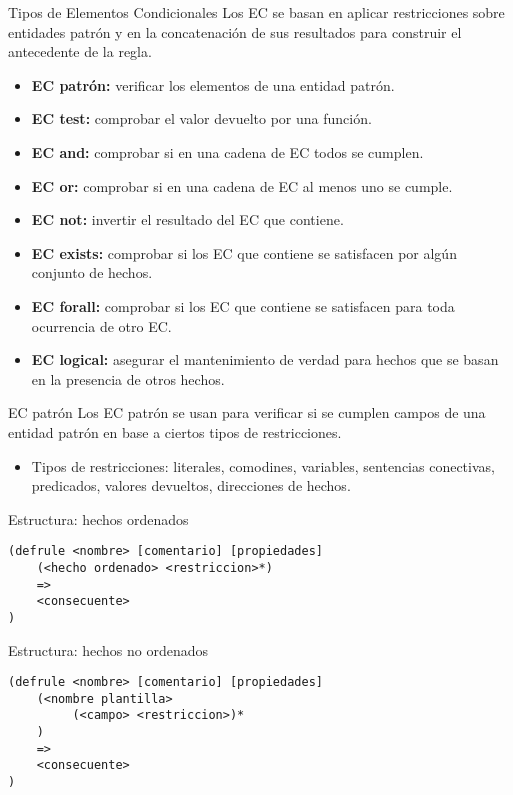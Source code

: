 \documentclass[usenames,dvipsnames,aspectratio=169]{beamer}
\begin{document}
\begin{frame}{Tipos de Elementos Condicionales}
	Los EC se basan en aplicar restricciones sobre entidades patrón y en la concatenación de sus resultados para construir el antecedente de la regla.
	\begin{itemize}
		\item \textbf{EC patrón:} verificar los elementos de una entidad patrón.
		\item \textbf{EC test:} comprobar el valor devuelto por una función.
		\item \textbf{EC and:} comprobar si en una cadena de EC todos se cumplen.
		\item \textbf{EC or:} comprobar si en una cadena de EC al menos uno se cumple.
		\item \textbf{EC not:} invertir el resultado del EC que contiene.
		\item \textbf{EC exists:} comprobar si los EC que contiene se satisfacen por algún conjunto de hechos.
		\item \textbf{EC forall:} comprobar si los EC que contiene se satisfacen para toda ocurrencia de otro EC.
		\item \textbf{EC logical:} asegurar el mantenimiento de verdad para hechos que se basan en la presencia de otros hechos.
	\end{itemize}
\end{frame}

\begin{frame}[fragile]{EC patrón}
	Los EC patrón se usan para verificar si se cumplen campos de una entidad patrón en base a ciertos tipos de restricciones.
	\begin{itemize}
		\item Tipos de restricciones: literales, comodines, variables, sentencias conectivas, predicados, valores devueltos, direcciones de hechos.
	\end{itemize}
	\begin{minipage}{.48\textwidth}
		\footnotesize
		\begin{block}{Estructura: hechos ordenados}
			\begin{verbatim}
(defrule <nombre> [comentario] [propiedades]
    (<hecho ordenado> <restriccion>*)
    =>
    <consecuente>
)
			\end{verbatim}
		\end{block}
	\end{minipage}
	\hfill
	\begin{minipage}{.48\textwidth}
		\footnotesize
		\begin{block}{Estructura: hechos no ordenados}
			\begin{verbatim}
(defrule <nombre> [comentario] [propiedades]
    (<nombre plantilla>
         (<campo> <restriccion>)*
    )
    =>
    <consecuente>
)
			\end{verbatim}
		\end{block}
	\end{minipage}
\end{frame}
\end{document}
